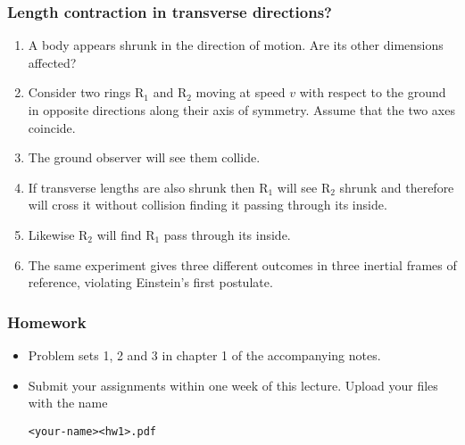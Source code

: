 \documentclass{beamer}
\begin{document}
\begin{frame}
\frametitle{Length contraction in transverse directions?}
\begin{enumerate}
\item A body appears shrunk in the direction of motion. Are its other dimensions
affected?
\item Consider two rings R$_{1}$ and R$_{2}$ moving at speed $v$ with respect
to the ground in opposite directions along their axis of symmetry. Assume that
the two axes coincide.
\item The ground observer will see them collide.
\item If transverse lengths are also shrunk then R$_{1}$ will see R$_{2}$ shrunk
and therefore will cross it without collision finding it passing through its
inside.
\item Likewise R$_{2}$ will find R$_{1}$ pass through its inside.
\item The same experiment gives three different outcomes in three inertial
frames of reference, violating Einstein's first postulate.
\end{enumerate}
\end{frame}

\begin{frame}[fragile]
\frametitle{Homework}
\begin{itemize}
\item Problem sets 1, 2 and 3 in chapter 1 of the accompanying notes.
\item Submit your assignments within one week of this lecture. Upload your 
files with the name \begin{verbatim}<your-name><hw1>.pdf\end{verbatim}
\end{itemize}
\end{frame}
\end{document}
